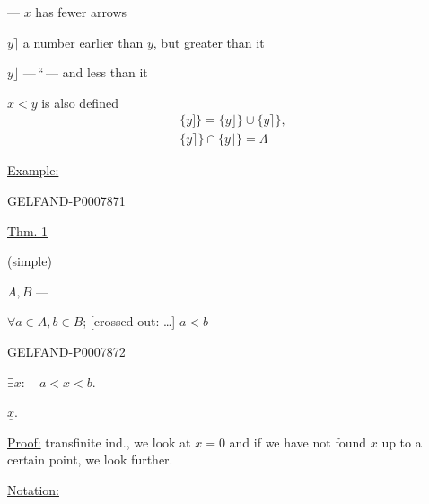  --- \(x\) has fewer arrows

\(y\rceil\) a number earlier than \(y\), but greater than it

\(y\rfloor\) ---\,\textquotedblleft\,--- and less than it

\(x<y\) is also defined
\begin{gather*}
\{y]\}=\{y\rfloor\}\cup\{y\rceil\},\\
\{y\rceil\}\cap\{y\rfloor\}=\Lambda
\end{gather*}

\underline{Example:}



\begin{GelfandAdjacentEvidence}{GELFAND-P000787}{1}

\underline{Thm. 1}

(simple)

\(A,B\) --- 

\(\forall a\in A,b\in B\); [crossed out: \ldots{}] \(a<b\)
\end{GelfandAdjacentEvidence}
\begin{GelfandAdjacentEvidence}{GELFAND-P000787}{2}


 \(\exists x:\quad a<x<b.\)

 \(\underline{x}\).

\underline{Proof:} transfinite ind., we look at \(x=0\) and if we have not found \(x\) up to a certain point, we look further.

\underline{Notation:}

\end{GelfandAdjacentEvidence}
